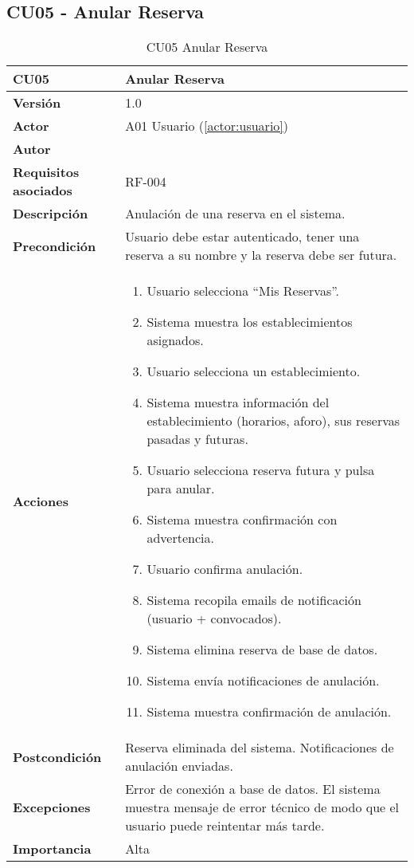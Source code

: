 \subsection{CU05 - Anular Reserva}

\begin{table}[H]
	\centering
	\begin{tabularx}{\linewidth}{ p{} p{} }
		\toprule
		\textbf{CU05}    & \textbf{Anular Reserva} \\
		\toprule
		\textbf{Versión}              & 1.0    \\
		\textbf{Actor}                & A01 Usuario (\ref{actor:usuario}) \\
		\textbf{Autor}                & \nombre \\
		\textbf{Requisitos asociados} & RF-004 \\
		\textbf{Descripción}          & Anulación de una reserva en el sistema. \\
		\textbf{Precondición}         & Usuario debe estar autenticado, tener una reserva a su nombre y la reserva debe ser futura. \\
		\textbf{Acciones}             &
		\begin{enumerate}
			\def\labelenumi{\arabic{enumi}.}
			\tightlist
			\item Usuario selecciona ``Mis Reservas''.
            \item Sistema muestra los establecimientos asignados.
            \item Usuario selecciona un establecimiento.
            \item Sistema muestra información del establecimiento (horarios, aforo), sus reservas pasadas y futuras.
            \item Usuario selecciona reserva futura y pulsa para anular.
            \item Sistema muestra confirmación con advertencia.
            \item Usuario confirma anulación.
            \item Sistema recopila emails de notificación (usuario + convocados).
            \item Sistema elimina reserva de base de datos.
            \item Sistema envía notificaciones de anulación.
            \item Sistema muestra confirmación de anulación.
		\end{enumerate}\\
		\textbf{Postcondición}        & Reserva eliminada del sistema. Notificaciones de anulación enviadas.\\
		\textbf{Excepciones}          & Error de conexión a base de datos. El sistema muestra mensaje de error técnico de modo que el usuario puede reintentar más tarde.\\
		\textbf{Importancia}          & Alta \\
		\bottomrule
	\end{tabularx}
	\caption{CU05 Anular Reserva}
	\label{cu:anular-reserva}
\end{table}

